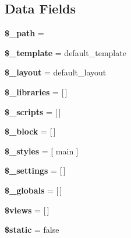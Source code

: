 \subsection*{Data Fields}
\begin{DoxyCompactItemize}
\item 
\mbox{\label{class_lora_1_1_page_a7827e5ae727e96269db2e008bbfb9773}} 
{\bfseries \$\+\_\+path} = \textquotesingle{}\textquotesingle{}
\item 
\mbox{\label{class_lora_1_1_page_a353afce17912a98c6a9ead92e679570d}} 
{\bfseries \$\+\_\+template} = \textquotesingle{}default\+\_\+template\textquotesingle{}
\item 
\mbox{\label{class_lora_1_1_page_a7b6bdb042d5d650c70c74ee40e7a0a71}} 
{\bfseries \$\+\_\+layout} = \textquotesingle{}default\+\_\+layout\textquotesingle{}
\item 
\mbox{\label{class_lora_1_1_page_a8ad159a11a3bfceca008de351d6fbebc}} 
{\bfseries \$\+\_\+libraries} = \mbox{[}$\,$\mbox{]}
\item 
\mbox{\label{class_lora_1_1_page_a714e6e780b17b3b8e7db069f2a96a119}} 
{\bfseries \$\+\_\+scripts} = \mbox{[}$\,$\mbox{]}
\item 
\mbox{\label{class_lora_1_1_page_a6a9b671eef2739e0495fccf247f1af33}} 
{\bfseries \$\+\_\+block} = \mbox{[}$\,$\mbox{]}
\item 
\mbox{\label{class_lora_1_1_page_a9c54ba83a52cee3c5a4b47dea3412c53}} 
{\bfseries \$\+\_\+styles} = \mbox{[} \textquotesingle{}main\textquotesingle{} \mbox{]}
\item 
\mbox{\label{class_lora_1_1_page_ae71957e155571d18b12826f6587b4c14}} 
{\bfseries \$\+\_\+settings} = \mbox{[}$\,$\mbox{]}
\item 
\mbox{\label{class_lora_1_1_page_a24e35d3a7209e621e2395649a2c8cdea}} 
{\bfseries \$\+\_\+globals} = \mbox{[}$\,$\mbox{]}
\item 
\mbox{\label{class_lora_1_1_page_a2bc32a57c3a42b3b411c76e457481767}} 
{\bfseries \$views} = \mbox{[}$\,$\mbox{]}
\item 
\mbox{\label{class_lora_1_1_page_a27f70cf38a488e14c8c23bfa04c2ca92}} 
{\bfseries \$static} = false
\end{DoxyCompactItemize}
